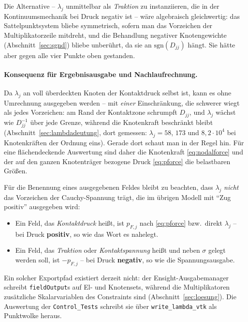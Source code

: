 \documentclass[a4paper,11pt]{article}
\def\tilde#1{#1}%
\newcommand{\code}[1]{\texttt{\small #1}}
\newcommand{\file}[1]{\texttt{\small #1}}
\begin{document}
\noindent Die Alternative -- $\lambda_j$ unmittelbar als \emph{Traktion} zu instanziieren, die in
der Kontinuumsmechanik bei Druck negativ ist -- wäre algebraisch gleichwertig: das
Sattelpunktsystem bliebe symmetrisch, sofern man das Vorzeichen der Multiplikatorzeile mitdreht,
und die Behandlung negativer Knotengewichte (Abschnitt~\ref{sec:sgnd}) bliebe unberührt, da sie an
$\mathrm{sgn}(\tilde D_{jj})$ hängt. Sie hätte aber gegen alle vier Punkte oben gestanden.

\paragraph{Konsequenz für Ergebnisausgabe und Nachlaufrechnung.}
Da $\lambda_j$ an voll überdeckten Knoten der Kontaktdruck selbst ist, kann es ohne Umrechnung
ausgegeben werden -- mit \emph{einer} Einschränkung, die schwerer wiegt als jedes Vorzeichen: am
Rand der Kontaktzone schrumpft $\tilde D_{jj}$, und $\lambda_j$ wächst wie $\tilde D_{jj}^{-1}$
über jede Grenze, während die Knotenkraft beschränkt bleibt (Abschnitt~\ref{sec:lambdadeutung},
dort gemessen: $\lambda_j=58$, $173$ und $8{,}2\cdot10^4$ bei Knotenkräften der Ordnung eins).
Gerade dort schaut man in der Regel hin. Für eine flächendeckende Auswertung sind daher die
Knotenkraft \eqref{eq:nodalforce} und der auf den ganzen Knotenträger bezogene Druck
\eqref{eq:pforce} die belastbaren Größen.

Für die Benennung eines ausgegebenen Feldes bleibt zu beachten, dass $\lambda_j$ \emph{nicht} das
Vorzeichen der Cauchy-Spannung trägt, die im übrigen Modell mit ``Zug positiv'' ausgegeben wird:
\begin{itemize}\itemsep2pt
  \item Ein Feld, das \emph{Kontaktdruck} heißt, ist $p_{F,j}$ nach \eqref{eq:pforce} bzw.\ direkt
        $\lambda_j$ -- bei Druck \textbf{positiv}, so wie das Wort es nahelegt.
  \item Ein Feld, das \emph{Traktion} oder \emph{Kontaktspannung} heißt und neben $\sigma$ gelegt
        werden soll, ist $-p_{F,j}$ -- bei Druck \textbf{negativ}, so wie die Spannungsausgabe.
\end{itemize}

\noindent Ein solcher Exportpfad existiert derzeit nicht: der Ensight-Ausgabemanager schreibt
\code{fieldOutput}s auf El- und Knotensets, während die Multiplikatoren zusätzliche
Skalarvariablen des Constraints sind (Abschnitt~\ref{sec:loesung}). Die Auswertung der
\file{Control\_Tests} schreibt sie über \code{write\_lambda\_vtk} als Punktwolke heraus.
\end{document}
